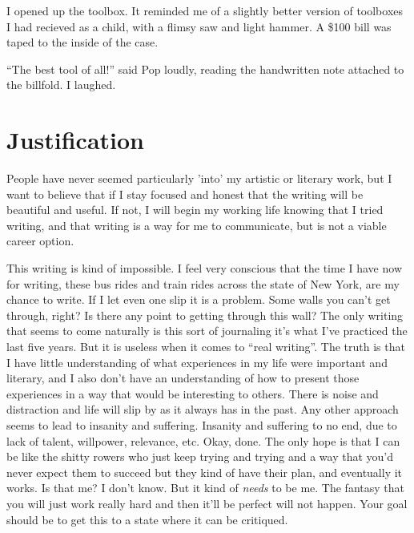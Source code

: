I opened up the toolbox.  It reminded me of a slightly better version of
toolboxes I had recieved as a child, with a flimsy saw and light hammer.  A
\$100 bill was taped to the inside of the case.

``The best tool of all!'' said Pop loudly, reading the handwritten note attached
to the billfold.  I laughed.


\section{}

\chapter{Justification} 

People have never seemed particularly 'into' my artistic or literary work, but I
want to believe that if I stay focused and honest that the writing will be
beautiful and useful.  If not, I will begin my working life knowing that I tried
writing, and that writing is a way for me to communicate, but is not a viable
career option.

This writing is kind of impossible.  I feel very conscious that the time I have
now for writing, these bus rides and train rides across the state of New York,
are my chance to write.  If I let even one slip it is a problem.  Some walls you
can't get through, right?  Is there any point to getting through this wall?  The
only writing that seems to come naturally is this sort of journaling  it's what
I've practiced the last five years.  But it is useless when it comes to ``real
writing''.  The truth is that I have little understanding of what experiences in
my life were important and literary, and I also don't have an understanding of
how to present those experiences in a way that would be interesting to others.
There is noise and distraction and life will slip by as it always has in the
past.  Any other approach seems to lead to insanity and suffering.  Insanity and
suffering to no end, due to lack of talent, willpower, relevance, etc.  Okay,
done.  The only hope is that I can be like the shitty rowers who just keep
trying and trying and a way that you'd never expect them to succeed but they
kind of have their plan, and eventually it works.  Is that me?  I don't know.
But it kind of \textit{needs} to be me.
The fantasy that you will just work really hard and then it'll be perfect will
not happen.  Your goal should be to get this to a state where it can be
critiqued.

